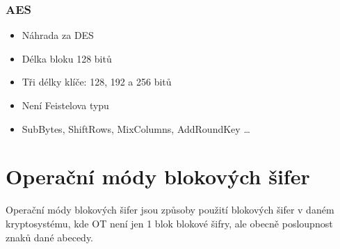 \documentclass{szzclass}
\begin{document}
\subsubsection{AES}
\begin{itemize}
\item Náhrada za DES
\item Délka bloku 128 bitů
\item Tři délky klíče: 128, 192 a 256 bitů 
\item Není Feistelova typu
\item SubBytes, ShiftRows, MixColumns, AddRoundKey \dots
\end{itemize}

\section{Operační módy blokových šifer}
Operační módy blokových šifer jsou způsoby použití blokových šifer v daném kryptosystému, kde OT není jen 1 blok blokové šifry, ale obecně posloupnost znaků dané abecedy.
\end{document}
